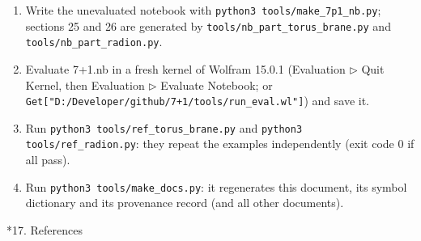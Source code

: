 \documentclass[10pt,a4paper]{article}
\makeatletter
\renewcommand\section{\@startsection{section}{1}{\z@}{-3.5ex \@plus -1ex \@minus -.2ex}{2.3ex \@plus.2ex}{\normalfont\Large\bfseries\raggedright}}
\makeatother
\begin{document}
\begin{enumerate}
\item Write the unevaluated notebook with \texttt{python3 tools/\allowbreak{}make\_\allowbreak{}7p1\_\allowbreak{}nb.py}; sections 25 and 26 are generated by \texttt{tools/\allowbreak{}nb\_\allowbreak{}part\_\allowbreak{}torus\_\allowbreak{}brane.py} and \texttt{tools/\allowbreak{}nb\_\allowbreak{}part\_\allowbreak{}radion.py}.
\item Evaluate 7+1.nb in a fresh kernel of Wolfram 15.0.1 (Evaluation \texorpdfstring{\ensuremath{\triangleright}}{▸} Quit Kernel, then Evaluation \texorpdfstring{\ensuremath{\triangleright}}{▸} Evaluate Notebook; or \texttt{Get["D:/\allowbreak{}Developer/\allowbreak{}github/\allowbreak{}7+1/\allowbreak{}tools/\allowbreak{}run\_\allowbreak{}eval.wl"]}) and save it.
\item Run \texttt{python3 tools/\allowbreak{}ref\_\allowbreak{}torus\_\allowbreak{}brane.py} and \texttt{python3 tools/\allowbreak{}ref\_\allowbreak{}radion.py}: they repeat the examples independently (exit code 0 if all pass).
\item Run \texttt{python3 tools/\allowbreak{}make\_\allowbreak{}docs.py}: it regenerates this document, its symbol dictionary and its provenance record (and all other documents).
\end{enumerate}
\section*{17. References}
\end{document}
